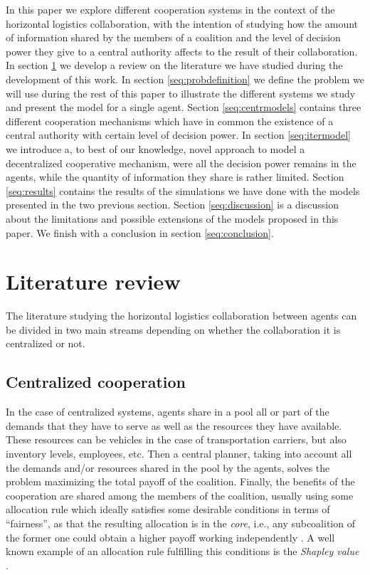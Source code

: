 \documentclass[authoryear]{elsarticle}
\begin{document}
In this paper we explore different cooperation systems in the context of the horizontal logistics collaboration, with the intention of studying how the amount of information shared by the members of a coalition and the level of decision power they give to a central authority affects to the result of their collaboration. In section \ref{seq:litreview} we develop a review on the literature we have studied during the development of this work. In section \ref{seq:probdefinition} we define the problem we will use during the rest of this paper to illustrate the different systems we study and present the model for a single agent. Section \ref{seq:centrmodels} contains three different cooperation mechanisms which have in common the existence of a central authority with certain level of decision power. In section \ref{seq:itermodel} we introduce a, to best of our knowledge, novel approach to model a decentralized cooperative mechanism, were all the decision power remains in the agents, while the quantity of information they share is rather limited. Section \ref{seq:results} contains the results of the simulations we have done with the models presented in the two previous section. Section \ref{seq:discussion} is a discussion about the limitations and possible extensions of the models proposed in this paper. We finish with a conclusion in section \ref{seq:conclusion}.



\section{Literature review}\label{seq:litreview}

The literature studying the horizontal logistics collaboration between agents
can be divided in two main streams depending on whether the collaboration it is
centralized or not.

\subsection{Centralized cooperation}

In the case of centralized systems, agents share in a pool all or
part of the demands that they have to serve as well as the resources they have available. These resources can be vehicles in the case of transportation carriers, but also inventory levels, employees, etc. Then a central planner, taking into account all the demands and/or resources shared in the pool by the agents, solves the problem maximizing the total payoff of the coalition. Finally, the benefits of the cooperation are shared among the members of the coalition, usually using some allocation rule which ideally satisfies some desirable conditions in terms of ``fairness'', as that the resulting allocation is in the \emph{core}, i.e., any subcoalition of the former one could obtain a higher payoff working
independently \citep{GONZALEZ2010}. A well known example of an allocation rule fulfilling this conditions is the \emph{Shapley value} \citep{SHAPLEY1952}.
\end{document}
